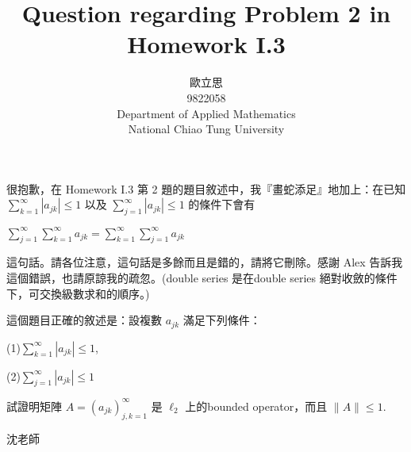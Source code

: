 \documentclass[8pt]{article} %
\title{Question regarding Problem 2 in Homework I.3}
\author{歐立思\\9822058\\Department of Applied Mathematics\\National Chiao Tung University}
\begin{document}
\begin{CJK}{UTF8}{bsmi}
\maketitle
\end{CJK}

\begin{CJK}{UTF8}{bsmi}
很抱歉，在 Homework I.3 第 2 題的題目敘述中，我『畫蛇添足』地加上：在已知 $\sum_{k=1}^{\infty}|a_{jk}|\le 1$
以及 $\sum_{j=1}^{\infty}|a_{jk}|\le 1$ 的條件下會有

$\sum_{j=1}^{\infty}\sum_{k=1}^{\infty}a_{jk}=\sum_{k=1}^{\infty}\sum_{j=1}^{\infty}a_{jk}$


這句話。請各位注意，這句話是多餘而且是錯的，請將它刪除。感謝 Alex 告訴我這個錯誤，也請原諒我的疏忽。(double series 是在double series 絕對收斂的條件下，可交換級數求和的順序。)

這個題目正確的敘述是：設複數 $a_{jk}$ 滿足下列條件：

(1)$\sum_{k=1}^{\infty}|a_{jk}|\le 1$,


(2)$\sum_{j=1}^{\infty}|a_{jk}|\le 1$

試證明矩陣 $A=(a_{jk})_{j,k=1}^{\infty}$ 是 $\ell_2$ 上的bounded operator，而且 $\|A\|\le 1$.

沈老師
\end{CJK}
\end{document}
